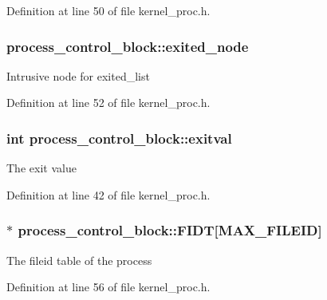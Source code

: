 Definition at line 50 of file kernel\+\_\+proc.\+h.

\subsubsection[{\texorpdfstring{exited\+\_\+node}{exited_node}}]{ process\+\_\+control\+\_\+block\+::exited\+\_\+node}\hypertarget{structprocess__control__block_a9e0d93783a89bd92f39243353f04a27e}{}\label{structprocess__control__block_a9e0d93783a89bd92f39243353f04a27e}
Intrusive node for {\ttfamily exited\+\_\+list} 

Definition at line 52 of file kernel\+\_\+proc.\+h.

\subsubsection[{\texorpdfstring{exitval}{exitval}}]{\setlength{\rightskip}{0pt plus 5cm}int process\+\_\+control\+\_\+block\+::exitval}\hypertarget{structprocess__control__block_add9b4f6d506a3538be7b53411e94fd28}{}\label{structprocess__control__block_add9b4f6d506a3538be7b53411e94fd28}
The exit value 

Definition at line 42 of file kernel\+\_\+proc.\+h.

\subsubsection[{\texorpdfstring{F\+I\+DT}{FIDT}}]{$\ast$ process\+\_\+control\+\_\+block\+::\+F\+I\+DT\mbox{[}{\bf M\+A\+X\+\_\+\+F\+I\+L\+E\+ID}\mbox{]}}\hypertarget{structprocess__control__block_aad72d85bd79a3100a497d11630a38977}{}\label{structprocess__control__block_aad72d85bd79a3100a497d11630a38977}
The fileid table of the process 

Definition at line 56 of file kernel\+\_\+proc.\+h.

